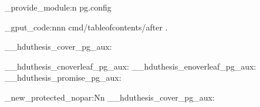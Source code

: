 \ExplSyntaxOn \makeatletter
\hduthesis_provide_module:n {pg.config}

\geometry { top = 2.8cm, bottom = 3.2cm, left = 3.2cm, right = 3.2cm,
            headheight = 15pt, headsep = .72cm, footskip = 1.5cm }
\hook_gput_code:nnn { cmd/tableofcontents/after } { . }
  {
    \clearpage
    \cfoot{\small \thepage}
  }

\RenewDocumentCommand \maketitle {}
  {
    \begin{titlepage}
      \__hduthesis_cover_pg_aux:
    \end{titlepage}
    \titlepage
    \__hduthesis_cnoverleaf_pg_aux:
    \endtitlepage
    \titlepage
      \__hduthesis_enoverleaf_pg_aux:
    \endtitlepage
    \titlepage
      \__hduthesis_promise_pg_aux:
    \endtitlepage
    \restoregeometry
    \cfoot {\small \thepage}
  }
\cs_new_protected_nopar:Nn \__hduthesis_cover_pg_aux:
